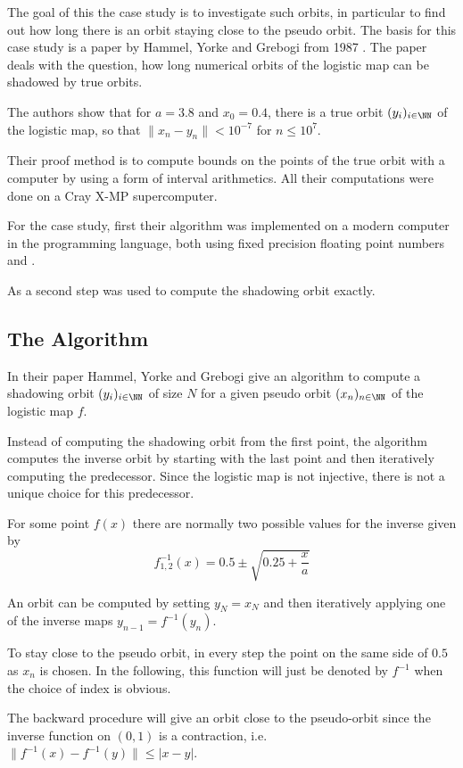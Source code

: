     The goal of this the case study is to investigate such orbits, in
    particular to find out how long there is an orbit staying close to the
    pseudo orbit. 
    The basis for this case study is a paper by Hammel, Yorke
    and Grebogi from 1987 \cite{Hammel1987}.
    The paper deals with the question, how long numerical orbits of the logistic map can be shadowed by true orbits.

    The authors show that for $a = 3.8$ and $x_0 = 0.4$, there is a true orbit $(y_i)_{i \in \NN}$ of the logistic map, so that $\| x_n - y_n \| < 10^{-7}$ for $n \leq 10^7$.

    Their proof method is to compute bounds on the points of the true orbit with a computer by using a form of interval arithmetics. 
    All their computations were done on a Cray X-MP supercomputer. 

    For the case study, first their algorithm was implemented on a modern
    computer in the \cc programming language, both using fixed precision
    floating point numbers and \irram. 

    As a second step \irram was used to compute the shadowing orbit exactly.
  \subsection{The Algorithm}
    In their paper Hammel, Yorke and Grebogi give an algorithm to compute a
    shadowing orbit $(y_i)_{i \in \NN}$ of size $N$ for a given pseudo orbit
    $(x_n)_{n \in \NN}$ of the logistic map $f$.

    Instead of computing the shadowing orbit from the first point, the
    algorithm computes the inverse orbit by starting with the last point and
    then iteratively computing the predecessor.  Since the logistic map is not
    injective, there is not a unique choice for this predecessor. 

    For some point $f(x)$ there are normally two possible values for the
    inverse given by $$f^{-1}_{1,2}(x) = 0.5 \pm \sqrt{0.25 + \frac{x}{a}} $$

    An orbit can be computed by setting $y_N = x_N$ and then iteratively
    applying one of the inverse maps $y_{n-1} = f^{-1}(y_n)$.  

    To stay close to the pseudo orbit, in every step the point on the same side
    of $0.5$ as $x_n$ is chosen.
    In the following, this function will just be denoted by $f^{-1}$ when the choice of index is
    obvious.
    
    The backward procedure will give an orbit close to the pseudo-orbit since the
    inverse function on $(0,1)$ is a contraction, i.e. $\| f^{-1}(x) -
    f^{-1}(y) \| \leq |x-y|$. 


